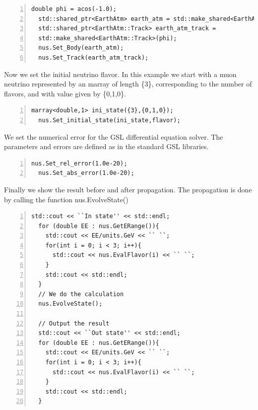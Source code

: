 \documentclass[3p,12pt]{elsarticle}
\newcommand{\ttf}{\ttfamily}
\begin{document}
\begin{lstlisting}[frame=leftline, numbers = left,breaklines=true, label = ex:sin1,firstnumber=last]
  double phi = acos(-1.0);
  std::shared_ptr<EarthAtm> earth_atm = std::make_shared<EarthAtm>();
  std::shared_ptr<EarthAtm::Track> earth_atm_track =
  std::make_shared<EarthAtm::Track>(phi);
  nus.Set_Body(earth_atm);
  nus.Set_Track(earth_atm_track);
\end{lstlisting}

Now we set the initial neutrino flavor. In this example we start with
a muon neutrino represented by an {\ttf marray} of length {\ttf
  \{3\}}, corresponding to the number of flavors, and with value given
by {\ttf\{0,1,0\}}.


\begin{lstlisting}[frame=leftline, numbers = left,breaklines=true, label = ex:sin1,firstnumber=last]
  marray<double,1> ini_state({3},{0,1,0});
  nus.Set_initial_state(ini_state,flavor);
\end{lstlisting}

We set the numerical error for the GSL differential equation solver.
The parameters and errors are defined as in the standard GSL libraries.

\begin{lstlisting}[frame=leftline, numbers = left,breaklines=true, label = ex:sin1,firstnumber=last]
  nus.Set_rel_error(1.0e-20);
  nus.Set_abs_error(1.0e-20);
\end{lstlisting}

Finally we show the result before and after propagation. The
propagation is done by calling the function {\ttf nus.EvolveState()}

\begin{lstlisting}[frame=leftline, numbers = left,breaklines=true, label = ex:sin1,firstnumber=last]
  std::cout << ``In state'' << std::endl;
  for (double EE : nus.GetERange()){
    std::cout << EE/units.GeV << `` ``;
    for(int i = 0; i < 3; i++){
      std::cout << nus.EvalFlavor(i) << `` ``;
    }
    std::cout << std::endl;
  }
  // We do the calculation                                                                                  
  nus.EvolveState();
  
  // Output the result                                                                                 
  std::cout << ``Out state'' << std::endl;
  for (double EE : nus.GetERange()){
    std::cout << EE/units.GeV << `` ``;
    for(int i = 0; i < 3; i++){
      std::cout << nus.EvalFlavor(i) << `` ``;
    }
    std::cout << std::endl;
  }
\end{lstlisting}
\end{document}
